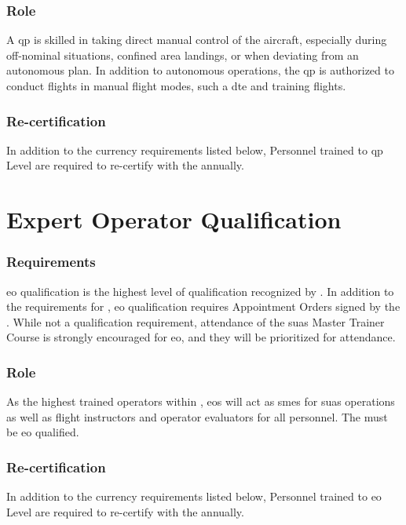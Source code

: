             \subsubsection{Role}A \ac{qp} is skilled in taking direct manual control of the aircraft, especially during off-nominal situations, confined area landings, or when deviating from an autonomous plan. In addition to autonomous operations, the \ac{qp} is authorized to conduct flights in manual flight modes, such a \ac{dte} and training flights.

            \subsubsection{Re-certification}In addition to the currency requirements listed below, Personnel trained to \ac{qp} Level are required to re-certify with the  annually.

            
    \section{Expert Operator Qualification}\label{sec:qual-eo}

            \subsubsection{Requirements}\acf{eo} qualification is the highest level of qualification recognized by \projectmars{}.  In addition to the requirements for , \ac{eo} qualification requires Appointment Orders signed by the .  While not a qualification requirement, attendance of the \ac{suas} Master Trainer Course is strongly encouraged for \ac{eo}, and they will be prioritized for attendance. 

            \subsubsection{Role} As the highest trained operators within \projectmars{}, \ac{eo}s will act as \ac{sme}s for \ac{suas} operations as well as flight instructors and operator evaluators for all \projectmars{} personnel. The  must be \ac{eo} qualified.

            \subsubsection{Re-certification}In addition to the currency requirements listed below, Personnel trained to \ac{eo} Level are required to re-certify with the  annually.
     
